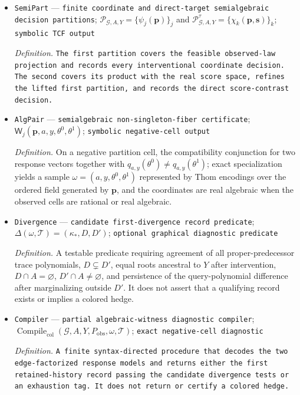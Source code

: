 \documentclass{article}
\begin{document}
\begin{itemize}
  \item \texttt{SemiPart} --- \texttt{finite coordinate and direct-\allowbreak{}target semialgebraic decision partitions}; \(\mathscr P_{\mathcal G,A,Y}=\{\psi_j(\mathbf p)\}_j\) and \(\mathscr P^{\tau}_{\mathcal G,A,Y}=\{\chi_k(\mathbf p,\mathbf s)\}_k\); \texttt{symbolic TCF output}
  \par\smallskip\noindent\emph{Definition.} \texttt{The first partition covers the feasible observed-\allowbreak{}law projection and records every interventional coordinate decision. The second covers its product with the real score space,\allowbreak{} refines the lifted first partition,\allowbreak{} and records the direct score-\allowbreak{}contrast decision.}
  \item \texttt{AlgPair} --- \texttt{semialgebraic non-\allowbreak{}singleton-\allowbreak{}fiber certificate}; \(\mathsf W_j(\mathbf p,a,y,\theta^0,\theta^1)\); \texttt{symbolic negative-\allowbreak{}cell output}
  \par\smallskip\noindent\emph{Definition.} On a negative partition cell, the compatibility conjunction for two response vectors together with \(q_{a,y}(\theta^0)\neq q_{a,y}(\theta^1)\); exact specialization yields a sample \(\omega=(a,y,\theta^0,\theta^1)\) represented by Thom encodings over the ordered field generated by \(\mathbf p\), and the coordinates are real algebraic when the observed cells are rational or real algebraic.
  \item \texttt{Divergence} --- \texttt{candidate first-\allowbreak{}divergence record predicate}; \(\Delta(\omega,\mathcal T)=(\kappa_*,D,D')\); \texttt{optional graphical diagnostic predicate}
  \par\smallskip\noindent\emph{Definition.} A testable predicate requiring agreement of all proper-predecessor trace polynomials, \(D\subsetneq D'\), equal roots ancestral to \(Y\) after intervention, \(D\cap A=\varnothing\), \(D'\cap A\neq\varnothing\), and persistence of the query-polynomial difference after marginalizing outside \(D'\). It does not assert that a qualifying record exists or implies a colored hedge.
  \item \texttt{Compiler} --- \texttt{partial algebraic-\allowbreak{}witness diagnostic compiler}; \(\operatorname{Compile}_{\mathrm{col}}(\mathcal G,A,Y,P_{\mathrm{obs}},\omega,\mathcal T)\); \texttt{exact negative-\allowbreak{}cell diagnostic}
  \par\smallskip\noindent\emph{Definition.} \texttt{A finite syntax-\allowbreak{}directed procedure that decodes the two edge-\allowbreak{}factorized response models and returns either the first retained-\allowbreak{}history record passing the candidate divergence tests or an exhaustion tag. It does not return or certify a colored hedge.}

\end{itemize}
\end{document}
